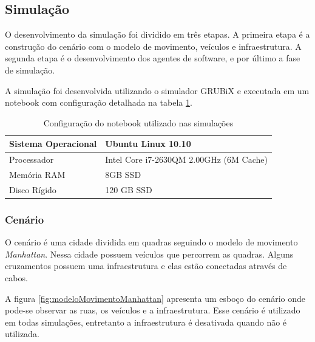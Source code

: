 \subsection{Simulação}
\label{subsec:simulacao}

O desenvolvimento da simulação foi dividido em três etapas. A primeira etapa é a construção do cenário com o modelo de movimento, veículos e infraestrutura. A segunda etapa é o desenvolvimento dos agentes de software, e por último a fase de simulação. 

A simulação foi desenvolvida utilizando o simulador GRUBiX e executada em um notebook com configuração detalhada na tabela \ref{tab:configuracaoNotebook}.

\begin{table}[ht]
	\caption{Configuração do notebook utilizado nas simulações}
	\centering
	\begin{tabular}{|l|l|}
		\hline
		Sistema Operacional & Ubuntu Linux 10.10 \\ \hline
		Processador & Intel Core i7-2630QM 2.00GHz (6M Cache) \\ \hline
		Memória RAM & 8GB SSD \\ \hline
		Disco Rígido & 120 GB SSD \\ \hline 
	\end{tabular}

	\label{tab:configuracaoNotebook}
\end{table}

\subsubsection{Cenário}

O cenário é uma cidade dividida em quadras seguindo o modelo de movimento \emph{Manhattan}. Nessa cidade possuem veículos que percorrem as quadras. Alguns cruzamentos possuem uma infraestrutura e elas estão conectadas através de cabos. 

A figura \ref{fig:modeloMovimentoManhattan} apresenta um esboço do cenário onde pode-se observar as ruas, os veículos e a infraestrutura. Esse cenário é utilizado em todas simulações, entretanto a infraestrutura é desativada quando não é utilizada.

